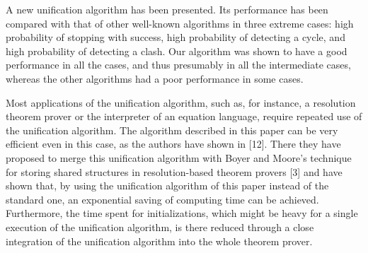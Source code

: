 \label{mmalg8}

A new unification algorithm has been presented. Its performance has been
compared with that of other well-known algorithms in three extreme cases: high
probability of stopping with success, high probability of detecting a cycle, and
high probability of detecting a clash. Our algorithm was shown to have a good
performance in all the cases, and thus presumably in all the intermediate cases,
whereas the other algorithms had a poor performance in some cases. 

Most applications of the unification algorithm, such as, for instance, a resolution
theorem prover or the interpreter of an equation language, require repeated use
of the unification algorithm. The algorithm described in this paper can be very
efficient even in this case, as the authors have shown in [12]. There they have
proposed to merge this unification algorithm with Boyer and Moore's technique
for storing shared structures in resolution-based theorem provers [3] and have
shown that, by using the unification algorithm of this paper instead of the
standard one, an exponential saving of computing time can be achieved. Furthermore,
the time spent for initializations, which might be heavy for a single
execution of the unification algorithm, is there reduced through a close integration
of the unification algorithm into the whole theorem prover. 